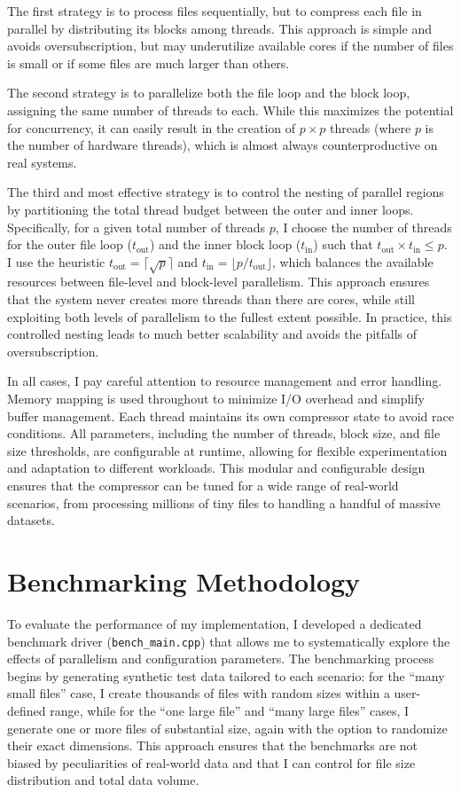 \documentclass[10pt]{article}
\begin{document}
The first strategy is to process files sequentially, but to compress each file in parallel by distributing its blocks among threads. This approach is simple and avoids oversubscription, but may underutilize available cores if the number of files is small or if some files are much larger than others.

The second strategy is to parallelize both the file loop and the block loop, assigning the same number of threads to each. While this maximizes the potential for concurrency, it can easily result in the creation of $p \times p$ threads (where $p$ is the number of hardware threads), which is almost always counterproductive on real systems.

The third and most effective strategy is to control the nesting of parallel regions by partitioning the total thread budget between the outer and inner loops. Specifically, for a given total number of threads $p$, I choose the number of threads for the outer file loop ($t_{\mathrm{out}}$) and the inner block loop ($t_{\mathrm{in}}$) such that $t_{\mathrm{out}} \times t_{\mathrm{in}} \leq p$. I use the heuristic $t_{\mathrm{out}} = \lceil \sqrt{p} \rceil$ and $t_{\mathrm{in}} = \lfloor p / t_{\mathrm{out}} \rfloor$, which balances the available resources between file-level and block-level parallelism. This approach ensures that the system never creates more threads than there are cores, while still exploiting both levels of parallelism to the fullest extent possible. In practice, this controlled nesting leads to much better scalability and avoids the pitfalls of oversubscription.

In all cases, I pay careful attention to resource management and error handling. Memory mapping is used throughout to minimize I/O overhead and simplify buffer management. Each thread maintains its own compressor state to avoid race conditions. All parameters, including the number of threads, block size, and file size thresholds, are configurable at runtime, allowing for flexible experimentation and adaptation to different workloads. This modular and configurable design ensures that the compressor can be tuned for a wide range of real-world scenarios, from processing millions of tiny files to handling a handful of massive datasets.

\section{Benchmarking Methodology}
To evaluate the performance of my implementation, I developed a dedicated benchmark driver (\texttt{bench\_main.cpp}) that allows me to systematically explore the effects of parallelism and configuration parameters. The benchmarking process begins by generating synthetic test data tailored to each scenario: for the “many small files” case, I create thousands of files with random sizes within a user-defined range, while for the “one large file” and “many large files” cases, I generate one or more files of substantial size, again with the option to randomize their exact dimensions. This approach ensures that the benchmarks are not biased by peculiarities of real-world data and that I can control for file size distribution and total data volume.
\end{document}
